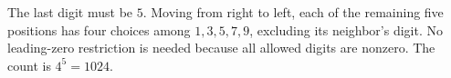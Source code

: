 The last digit must be $5$. Moving from right to left, each of the remaining five positions has four choices among $1,3,5,7,9$, excluding its neighbor's digit. No leading-zero restriction is needed because all allowed digits are nonzero. The count is $\boxed{4^5=1024}$.
